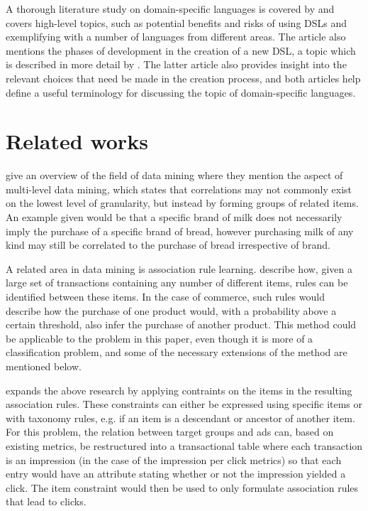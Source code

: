 \documentclass[a4paper]{article}
\begin{document}
A thorough literature study on domain-specific languages is covered by \citet{Deursen2000} and covers high-level topics, such as potential benefits and risks of using DSLs and exemplifying with a number of languages from different areas. The article also mentions the phases of development in the creation of a new DSL, a topic which is described in more detail by \citet{Mernik2005}. The latter article also provides insight into the relevant choices that need be made in the creation process, and both articles help define a useful terminology for discussing the topic of domain-specific languages.

\section{Related works}
\citet{Chen1996} give an overview of the field of data mining where they mention the aspect of multi-level data mining, which states that correlations may not commonly exist on the lowest level of granularity, but instead by forming groups of related items. An example given would be that a specific brand of milk does not necessarily imply the purchase of a specific brand of bread, however purchasing milk of any kind may still be correlated to the purchase of bread irrespective of brand.

A related area in data mining is association rule learning. \citet{Agrawal1993} describe how, given a large set of transactions containing any number of different items, rules can be identified between these items. In the case of commerce, such rules would describe how the purchase of one product would, with a probability above a certain threshold, also infer the purchase of another product. This method could be applicable to the problem in this paper, even though it is more of a classification problem, and some of the necessary extensions of the method are mentioned below.

\citet{Srikant1997} expands the above research by applying contraints on the items in the resulting association rules. These constraints can either be expressed using specific items or with taxonomy rules, e.g. if an item is a descendant or ancestor of another item. For this problem, the relation between target groups and ads can, based on existing metrics, be restructured into a transactional table where each transaction is an impression (in the case of the impression per click metrics) so that each entry would have an attribute stating whether or not the impression yielded a click. The item constraint would then be used to only formulate association rules that lead to clicks.
\end{document}
